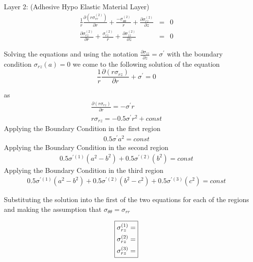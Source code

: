 \documentclass[11pt]{article} %
\makeatletter
\def \beg {\begin{equation}}
\def \en {\end{equation}}
\def\getproperty#1#2{%
  \expandafter\ifx\csname#1@p#2\endcsname\relax
  \else \csname#1@p#2\endcsname
  \fi
}%
\makeatother
\begin{document}
Layer 2: (Adhesive Hypo Elastic Material Layer)
		\beg
		\begin{aligned}
			\frac{1}{r}\frac{\partial(r\sigma_{rr}^{(2)})}{\partial r} + \frac {- \sigma_{\theta\theta}^{(2)}}{r} +  
					\frac{\partial \sigma_{rz}^{(2)}}{\partial z}  & =  &  0 \\
			\frac{\partial \sigma_{rz}^{(2)}}{\partial r} + \frac {\sigma_{rz}^{(2)}}{r} +  
					\frac{\partial \sigma_{zz}^{(2)}}{\partial z} & = & 0
		\end{aligned}
		\en

Solving the equations and using the notation $ \frac{\partial \sigma_{zz}}{\partial z}  = \sigma^{'}$  with the boundary condition $ \sigma_{rz} (a) = 0 $ we come to the following solution of the equation
	\beg
	\frac{1}{r}\frac{\partial (r\sigma_{rz})}{\partial r} +  \sigma^{'}   = 0
	\en

as 
	\beg
		\begin{aligned}
			\frac{\partial (r\sigma_{rz})}{\partial r} = -\sigma^{'}{r} \\
			r\sigma_{rz} =  -0.5 \sigma^{'}{r}^{2} + const 
		\end{aligned}
	\en
	Applying the Boundary Condition in the first region 
	\beg
		\begin{aligned}
			0.5 \sigma^{'}{a}^{2} =  const 
		\end{aligned}
	\en
	Applying the Boundary Condition in the second region 
	\beg
		\begin{aligned}
			0.5 \sigma^{'(1)}({a}^{2} - {b}^{2}) + 0.5 \sigma ^{'(2)}({b}^{2}) =  const 
		\end{aligned}
	\en
	Applying the Boundary Condition in the third region 
	\beg
		\begin{aligned}
			0.5 \sigma^{'(1)}({a}^{2} - {b}^{2}) + 0.5 \sigma ^{'(2)}({b}^{2} - {c}^{2}) + 0.5 \sigma ^{'(3)}({c}^2)=  const  
		\end{aligned}
	\en

	Substituting the solution into the first of the two equations for each of the regions and making the assumption that  $ \sigma_{\theta\theta} = \sigma_{rr}$


	\beg
		\boxed{
		\begin{aligned}
			\sigma_{rz}^{(1)} & = \getproperty{sigma}{1}\\
			\sigma_{rz}^{(2)} & = \getproperty{sigma}{2} \\ 
			\sigma_{rz}^{(3)} & = \getproperty{sigma}{3}
		\end{aligned}
		}
	\en		
\end{document}

